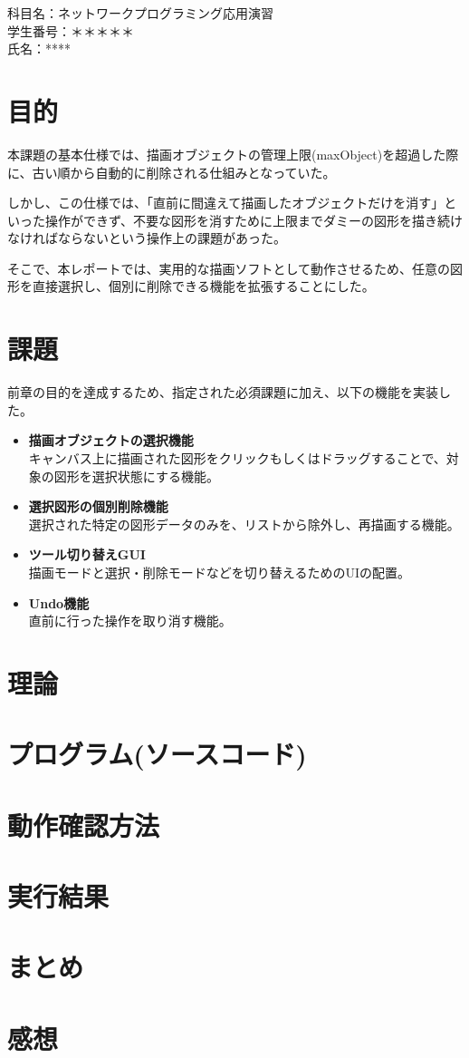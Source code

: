 \documentclass[11pt,a4paper]{ltjsarticle}
\begin{document}
\noindent
科目名：ネットワークプログラミング応用演習\\
学生番号：＊＊＊＊＊\\
氏名：****

\vspace{2em}

\section{目的}
本課題の基本仕様では、描画オブジェクトの管理上限(maxObject)を超過した際に、古い順から自動的に削除される仕組みとなっていた。

しかし、この仕様では、「直前に間違えて描画したオブジェクトだけを消す」といった操作ができず、不要な図形を消すために上限までダミーの図形を描き続けなければならないという操作上の課題があった。

そこで、本レポートでは、実用的な描画ソフトとして動作させるため、任意の図形を直接選択し、個別に削除できる機能を拡張することにした。

\section{課題}
前章の目的を達成するため、指定された必須課題に加え、以下の機能を実装した。
\begin{itemize}
    \item \textbf{描画オブジェクトの選択機能} \\
        キャンバス上に描画された図形をクリックもしくはドラッグすることで、対象の図形を選択状態にする機能。
    \item \textbf{選択図形の個別削除機能} \\
        選択された特定の図形データのみを、リストから除外し、再描画する機能。
    \item \textbf{ツール切り替えGUI} \\
        描画モードと選択・削除モードなどを切り替えるためのUIの配置。
    \item \textbf{Undo機能} \\
        直前に行った操作を取り消す機能。
\end{itemize}

\section{理論}

\section{プログラム(ソースコード)}

\section{動作確認方法}

\section{実行結果}

\section{まとめ}

\section{感想}
\end{document}
